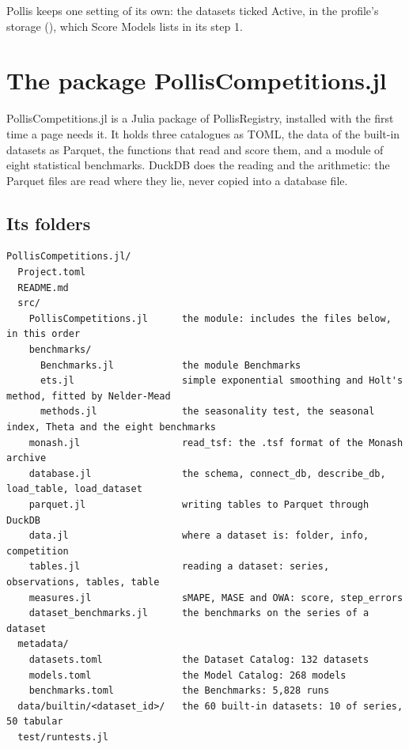 Pollis keeps one setting of its own: the datasets ticked Active, in the profile's storage
(), which Score Models lists in its step 1.

\section{The package PollisCompetitions.jl}
\label{sec:package}

PollisCompetitions.jl is a Julia package of PollisRegistry, installed with  the
first time a page needs it. It holds three catalogues as TOML, the data of the built-in datasets as Parquet, the
functions that read and score them, and a module of eight statistical benchmarks. DuckDB
 does the reading and the arithmetic: the Parquet files are read where
they lie, never copied into a database file.

\subsection{Its folders}

\begin{lstlisting}
PollisCompetitions.jl/
  Project.toml
  README.md
  src/
    PollisCompetitions.jl      the module: includes the files below, in this order
    benchmarks/
      Benchmarks.jl            the module Benchmarks
      ets.jl                   simple exponential smoothing and Holt's method, fitted by Nelder-Mead
      methods.jl               the seasonality test, the seasonal index, Theta and the eight benchmarks
    monash.jl                  read_tsf: the .tsf format of the Monash archive
    database.jl                the schema, connect_db, describe_db, load_table, load_dataset
    parquet.jl                 writing tables to Parquet through DuckDB
    data.jl                    where a dataset is: folder, info, competition
    tables.jl                  reading a dataset: series, observations, tables, table
    measures.jl                sMAPE, MASE and OWA: score, step_errors
    dataset_benchmarks.jl      the benchmarks on the series of a dataset
  metadata/
    datasets.toml              the Dataset Catalog: 132 datasets
    models.toml                the Model Catalog: 268 models
    benchmarks.toml            the Benchmarks: 5,828 runs
  data/builtin/<dataset_id>/   the 60 built-in datasets: 10 of series, 50 tabular
  test/runtests.jl
\end{lstlisting}

